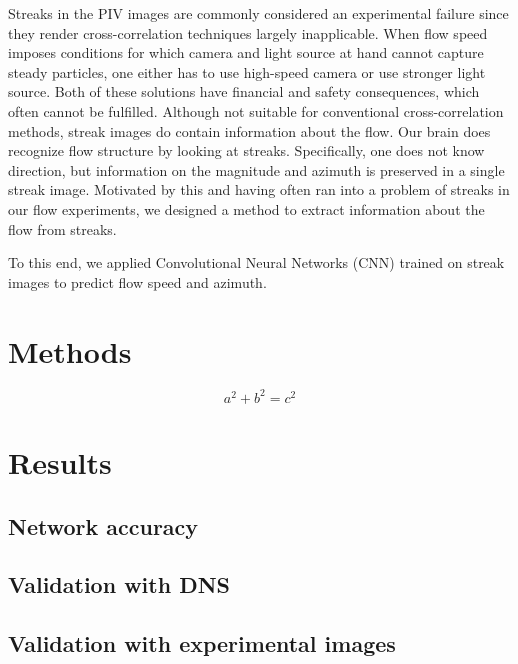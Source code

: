 \documentclass{svjour3}                     %
\begin{document}
Streaks in the PIV images are commonly considered an experimental failure since they render cross-correlation techniques largely inapplicable. When flow speed imposes conditions for which camera and light source at hand cannot capture steady particles, one either has to use high-speed camera or use stronger light source. Both of these solutions have financial and safety consequences, which often cannot be fulfilled. Although not suitable for conventional cross-correlation methods, streak images do contain information about the flow. Our brain does recognize flow structure by looking at streaks. Specifically, one does not know direction, but information on the magnitude and azimuth is preserved in a single streak image. Motivated by this and having often ran into a problem of streaks in our flow experiments, we designed a method to extract information about the flow from streaks. 

To this end, we applied Convolutional Neural Networks (CNN) trained on streak images to predict flow speed and azimuth.

\section{Methods}
\label{sec:methodology}

\begin{equation}
a^2+b^2=c^2
\end{equation}


\section{Results}

\subsection{Network accuracy}

\subsection{Validation with DNS}

\subsection{Validation with experimental images}
\end{document}
